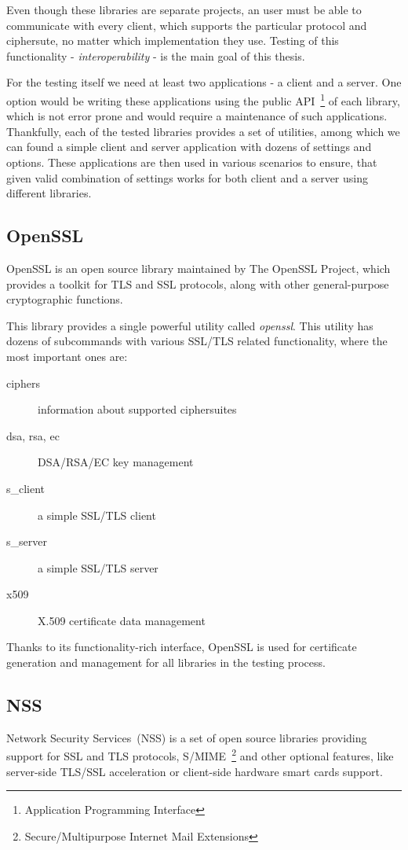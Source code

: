     Even though these libraries are
    separate projects, an user must be able to communicate with every client,
    which supports the particular protocol and ciphersute, no matter which
    implementation they use. Testing of this functionality - \textit{interoperability} -
    is the main goal of this thesis.

    For the testing itself we need at least two applications - a client and a server.
    One option would be writing these applications using the public
    API~\footnote{Application Programming Interface} of each library,
    which is not error prone and would require a maintenance of such applications.
    Thankfully, each of the tested libraries provides a set of utilities,
    among which we can found a simple client and server application with
    dozens of settings and options. These applications are then used in
    various scenarios to ensure, that given valid combination of settings works
    for both client and a server using different libraries.

\subsection{OpenSSL}
    OpenSSL is an open source library maintained by The OpenSSL Project,
    which provides a toolkit for TLS and SSL
    protocols, along with other general-purpose cryptographic functions.

    This library provides a single powerful utility called \textit{openssl}. This
    utility has dozens of subcommands with various SSL/TLS related functionality,
    where the most important ones are:
    \begin{description}
        \item [ciphers] information about supported ciphersuites
        \item [dsa, rsa, ec] DSA/RSA/EC key management
        \item [s\_client] a simple SSL/TLS client
        \item [s\_server] a simple SSL/TLS server
        \item [x509] X.509 certificate data management
    \end{description}

    Thanks to its functionality-rich interface, OpenSSL is used for certificate
    generation and management for all libraries in the testing process.

\subsection{NSS}
    Network Security Services~(NSS) is a set of open source libraries providing
    support for SSL and TLS protocols,
    S/MIME~\footnote{Secure/Multipurpose Internet Mail Extensions}
    and other optional features, like
    server-side TLS/SSL acceleration or client-side hardware smart cards support.

